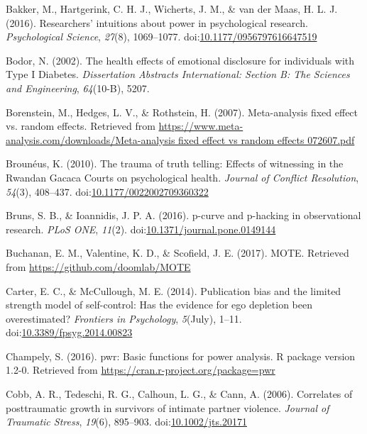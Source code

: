 \documentclass[english,man]{apa6}
\theoremstyle{definition}
\theoremstyle{definition}
\theoremstyle{definition}
\theoremstyle{remark}
\begin{document}
\hypertarget{ref-Bakker2016}{}
Bakker, M., Hartgerink, C. H. J., Wicherts, J. M., \& van der Maas, H.
L. J. (2016). Researchers' intuitions about power in psychological
research. \emph{Psychological Science}, \emph{27}(8), 1069--1077.
doi:\href{https://doi.org/10.1177/0956797616647519}{10.1177/0956797616647519}

\hypertarget{ref-Bodor2002}{}
Bodor, N. (2002). The health effects of emotional disclosure for
individuals with Type I Diabetes. \emph{Dissertation Abstracts
International: Section B: The Sciences and Engineering},
\emph{64}(10-B), 5207.

\hypertarget{ref-Borenstein2007}{}
Borenstein, M., Hedges, L. V., \& Rothstein, H. (2007). Meta-analysis
fixed effect vs. random effects. Retrieved from
\href{https://www.meta-analysis.com/downloads/Meta-analysis\%20fixed\%20effect\%20vs\%20random\%20effects\%20072607.pdf}{https://www.meta-analysis.com/downloads/Meta-analysis fixed effect vs random effects 072607.pdf}

\hypertarget{ref-Brouneus2010}{}
Brounéus, K. (2010). The trauma of truth telling: Effects of witnessing
in the Rwandan Gacaca Courts on psychological health. \emph{Journal of
Conflict Resolution}, \emph{54}(3), 408--437.
doi:\href{https://doi.org/10.1177/0022002709360322}{10.1177/0022002709360322}

\hypertarget{ref-Bruns2016}{}
Bruns, S. B., \& Ioannidis, J. P. A. (2016). p-curve and p-hacking in
observational research. \emph{PLoS ONE}, \emph{11}(2).
doi:\href{https://doi.org/10.1371/journal.pone.0149144}{10.1371/journal.pone.0149144}

\hypertarget{ref-Buchanan2017}{}
Buchanan, E. M., Valentine, K. D., \& Scofield, J. E. (2017). MOTE.
Retrieved from \url{https://github.com/doomlab/MOTE}

\hypertarget{ref-Carter2014}{}
Carter, E. C., \& McCullough, M. E. (2014). Publication bias and the
limited strength model of self-control: Has the evidence for ego
depletion been overestimated? \emph{Frontiers in Psychology},
\emph{5}(July), 1--11.
doi:\href{https://doi.org/10.3389/fpsyg.2014.00823}{10.3389/fpsyg.2014.00823}

\hypertarget{ref-Champely2016}{}
Champely, S. (2016). pwr: Basic functions for power analysis. R package
version 1.2-0. Retrieved from
\url{https://cran.r-project.org/package=pwr}

\hypertarget{ref-Cobb2006}{}
Cobb, A. R., Tedeschi, R. G., Calhoun, L. G., \& Cann, A. (2006).
Correlates of posttraumatic growth in survivors of intimate partner
violence. \emph{Journal of Traumatic Stress}, \emph{19}(6), 895--903.
doi:\href{https://doi.org/10.1002/jts.20171}{10.1002/jts.20171}
\end{document}
